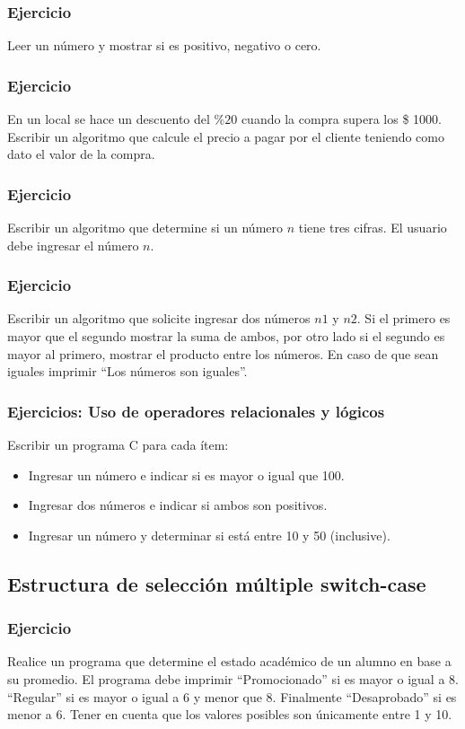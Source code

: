 \subsubsection{Ejercicio}
Leer un número y mostrar si es positivo, negativo o cero.

\subsubsection{Ejercicio}
En un local se hace un descuento del $\mathrm{\%20}$ cuando la compra supera los \$ 1000. Escribir un algoritmo que calcule el precio a pagar por el cliente teniendo como dato el valor de la compra.

\subsubsection{Ejercicio}
Escribir un algoritmo que determine si un número $n$ tiene tres cifras. El usuario debe ingresar el número $n$.

\subsubsection{Ejercicio}
Escribir un algoritmo que solicite ingresar dos números $n1$ y $n2$. Si el primero es mayor que el segundo mostrar la suma de ambos, por otro lado si el segundo es mayor al primero, mostrar el producto entre los números. En caso de que sean iguales imprimir ``Los números son iguales''.

\subsubsection{Ejercicios: Uso de operadores relacionales y lógicos}
Escribir un programa C para cada ítem:
\begin{itemize}
  \item Ingresar un número e indicar si es mayor o igual que 100.
  \item Ingresar dos números e indicar si ambos son positivos.
  \item Ingresar un número y determinar si está entre 10 y 50 (inclusive).
\end{itemize}


\subsection*{Estructura de selección múltiple switch-case}
\subsubsection{Ejercicio}
Realice un programa que determine el estado académico de un alumno en base a su promedio. El programa debe imprimir ``Promocionado'' si es mayor o igual a 8. ``Regular'' si es mayor o igual a 6 y menor que 8. Finalmente ``Desaprobado'' si es menor a 6.
Tener en cuenta que los valores posibles son únicamente entre 1 y 10.

